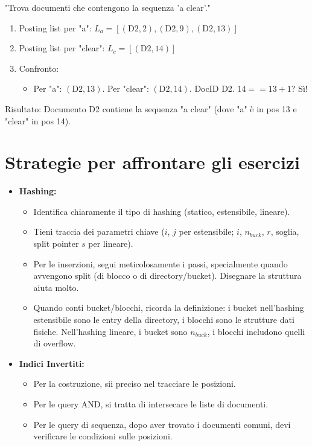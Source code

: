 "Trova documenti che contengono la sequenza 'a clear'."
\begin{enumerate}
    \item Posting list per "a": $L_a = [(\text{D2},2), (\text{D2},9), (\text{D2},13)]$
    \item Posting list per "clear": $L_c = [(\text{D2},14)]$
    \item Confronto:
    \begin{itemize}
        \item Per "a": $(\text{D2},13)$. Per "clear": $(\text{D2},14)$. DocID D2. $14 == 13+1$? Sì!
    \end{itemize}
\end{enumerate}
Risultato: Documento D2 contiene la sequenza "a clear" (dove "a" è in pos 13 e "clear" in pos 14).\section{Strategie per affrontare gli esercizi}
\begin{itemize}
    \item \textbf{Hashing:}
    \begin{itemize}
        \item Identifica chiaramente il tipo di hashing (statico, estensibile, lineare).
        \item Tieni traccia dei parametri chiave ($i$, $j$ per estensibile; $i$, $n_{buck}$, $r$, soglia, split pointer $s$ per lineare).
        \item Per le inserzioni, segui meticolosamente i passi, specialmente quando avvengono split (di blocco o di directory/bucket). Disegnare la struttura aiuta molto.
        \item Quando conti bucket/blocchi, ricorda la definizione: i bucket nell'hashing estensibile sono le entry della directory, i blocchi sono le strutture dati fisiche. Nell'hashing lineare, i bucket sono $n_{buck}$, i blocchi includono quelli di overflow.
    \end{itemize}
    \item \textbf{Indici Invertiti:}
    \begin{itemize}
        \item Per la costruzione, sii preciso nel tracciare le posizioni.
        \item Per le query AND, si tratta di intersecare le liste di documenti.
        \item Per le query di sequenza, dopo aver trovato i documenti comuni, devi verificare le condizioni sulle posizioni.
    \end{itemize}
\end{itemize}

